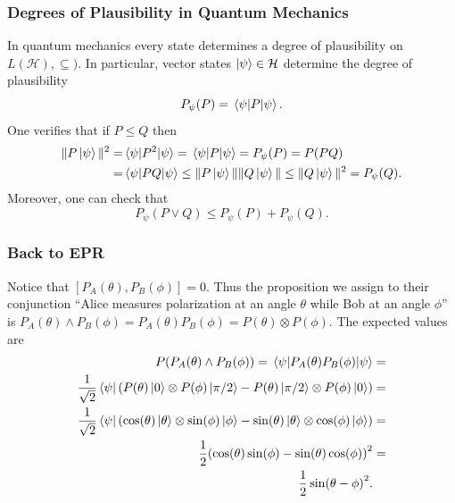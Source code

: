 \documentclass{beamer}
\begin{document}
\begin{frame}

	\frametitle{Degrees of Plausibility in Quantum Mechanics}
	
	In quantum mechanics every state determines a degree of plausibility on $L(\mathcal{H}),\subseteq)$. In particular, vector states $\ket{\psi}\in\mathcal{H}$ determine the degree of plausibility
	\begin{equation}
		P_\psi(P)=\ev{P}{\psi}.
	\end{equation}
	One verifies that if $P\leq Q$ then
	\begin{align}
	\begin{split}
		\|P\ket{\psi}\|^2=&\ev{P^2}{\psi}=\ev{P}{\psi}=P_\psi(P)=P(PQ)\\
		=&\ev{PQ}{\psi}\leq\|P\ket{\psi}\|\|Q\ket{\psi}\|\leq\|Q\ket{\psi}\|^2=P_\psi(Q).
	\end{split}
	\end{align}
	Moreover, one can check that
	\begin{equation}
		P_\psi(P\vee Q)\leq P_\psi(P)+P_\psi(Q).
	\end{equation}

\end{frame}

\begin{frame}

	\frametitle{Back to EPR}
	
	Notice that $[P_A(\theta),P_B(\phi)]=0$. Thus the proposition we assign to their conjunction ``Alice measures polarization at an angle $\theta$ while Bob at an angle $\phi$'' is $P_A(\theta)\wedge P_B(\phi)=P_A(\theta)P_B(\phi)=P(\theta)\otimes P(\phi)$. The expected values are
	\begin{align}
	\begin{split}
		P(P_A(\theta)\wedge P_B(\phi))=\ev{P_A(\theta)P_B(\phi)}{\psi}&=\\
		\frac{1}{\sqrt{2}}\bra{\psi}\qty(P(\theta)\ket{0}\otimes P(\phi)\ket{\pi/2}-P(\theta)\ket{\pi/2}\otimes P(\phi)\ket{0})&=\\
		\frac{1}{\sqrt{2}}\bra{\psi}\qty(\cos(\theta)\ket{\theta}\otimes \sin(\phi)\ket{\phi}-\sin(\theta)\ket{\theta}\otimes\cos(\phi)\ket{\phi})&=\\
		\frac{1}{2}\qty(\cos(\theta)\sin(\phi)-\sin(\theta)\cos(\phi))^2&=\\
		\frac{1}{2}\sin(\theta-\phi)^2.&
	\end{split}
	\end{align}

\end{frame}
\end{document}

